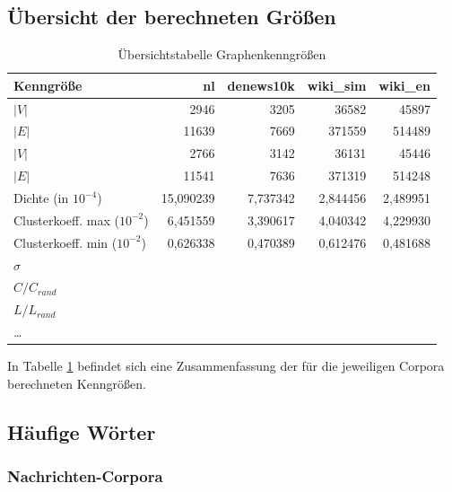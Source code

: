 \documentclass[11pt, a4paper]{article}
\begin{document}
\subsection{Übersicht der berechneten Größen}
\begin{table}[ht]
    \begin{tabular}{l*{4}{r}}
    \toprule
    Kenngröße & nl & denews10k & wiki\_sim & wiki\_en \\
    \midrule
    $|V|$                       & 2946      & 3205      & 36582     & 45897  \\
    $|E|$                       & 11639     & 7669      & 371559    & 514489 \\
    $|V|$\footnotemark[6]       & 2766      & 3142      & 36131     & 45446  \\
    $|E|$\footnotemark[6]       & 11541     & 7636      & 371319    & 514248 \\
    Dichte (in $10^{-4}$)       & 15,090239 & 7,737342  & 2,844456  & 2,489951 \\
    Clusterkoeff. max ($10^{-2}$) & 6,451559 & 3,390617 & 4,040342  & 4,229930 \\
    Clusterkoeff. min ($10^{-2}$) & 0,626338 & 0,470389 & 0,612476  & 0,481688 \\
    $\sigma$                    &           &           &           &         \\
    $C / C_{rand}$               &           &           &           &         \\
    $L / L_{rand}$               &           &           &           &         \\
    \dots                       &           &           &           &          \\
    \bottomrule
    \end{tabular}
    \caption{Übersichtstabelle Graphenkenngrößen}
    \label{tab-zsf}
\end{table}

In Tabelle \ref{tab-zsf} befindet sich eine Zusammenfassung der für die
jeweiligen Corpora berechneten Kenngrößen.


\subsection{H\"aufige W\"orter}

\subsubsection{Nachrichten-Corpora}
\end{document}
